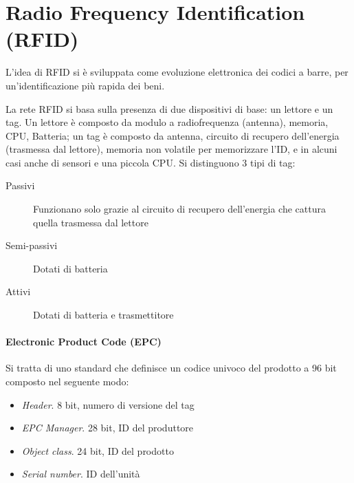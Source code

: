 \section{Radio Frequency Identification (RFID)}

	L'idea di RFID si è sviluppata come evoluzione elettronica dei codici a barre, per un'identificazione più rapida dei beni.
	
	La rete RFID si basa sulla presenza di due dispositivi di base: un lettore e un tag.
	Un lettore è composto da modulo a radiofrequenza (antenna), memoria, CPU, Batteria;
	un tag è composto da antenna, circuito di recupero dell'energia (trasmessa dal lettore), memoria non volatile per memorizzare l'ID, e in alcuni casi anche di sensori e una piccola CPU.
	Si distinguono 3 tipi di tag:
	\begin{description}
		\item[Passivi] Funzionano solo grazie al circuito di recupero dell'energia che cattura quella trasmessa dal lettore
		\item[Semi-passivi]  Dotati di batteria
		\item[Attivi] Dotati di batteria e trasmettitore
	\end{description}

	\paragraph{Electronic Product Code (EPC)}
	Si tratta di uno standard che definisce un codice univoco del prodotto a 96 bit composto nel seguente modo:
	\begin{itemize}
		\item \textit{Header}. 8 bit, numero di versione del tag
		\item \textit{EPC Manager}. 28 bit, ID del produttore
		\item \textit{Object class}. 24 bit, ID del prodotto
		\item \textit{Serial number}. ID dell'unità
	\end{itemize}